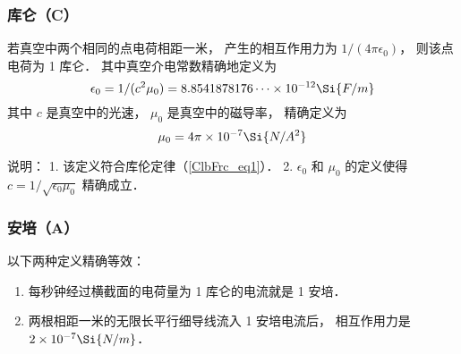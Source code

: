 \subsubsection{库仑（C）}
若真空中两个相同的点电荷相距一米， 产生的相互作用力为 $1/(4\pi\epsilon_0)$， 则该点电荷为 1 库仑． 其中真空介电常数精确地定义为
\begin{equation}
\epsilon_0 = 1/(c^2 \mu_0) = 8.8541878176\dots \times 10^{-12} \Si{F/m}
\end{equation}
其中 $c$ 是真空中的光速， $\mu_0$ 是真空中的磁导率， 精确定义为
\begin{equation}
\mu_0 = 4\pi \times 10^{-7} \Si{N/A^2}
\end{equation}

说明： 1. 该定义符合库伦定律（\autoref{ClbFrc_eq1}）． 2. $\epsilon_0$ 和 $\mu_0$ 的定义使得 $c = 1/\sqrt{\epsilon_0 \mu_0}$ 精确成立．

\subsubsection{安培（A）}
以下两种定义精确等效：
\begin{enumerate}
\item 每秒钟经过横截面的电荷量为 1 库仑的电流就是 1 安培．
\item 两根相距一米的无限长平行细导线流入 1 安培电流后， 相互作用力是 $2 \times 10^{-7}\Si{N/m}$． 
\end{enumerate}
